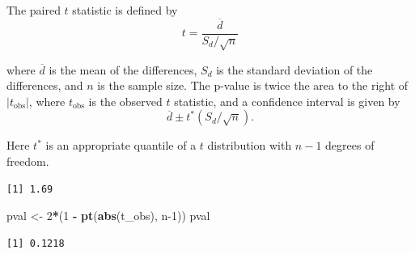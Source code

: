 \documentclass[
]{krantz}
\makeatletter
\newenvironment{Shaded}{\begin{snugshade}}{\end{snugshade}}
\newcommand{\DecValTok}[1]{\textcolor[rgb]{0.06,0.06,0.06}{#1}}
\newcommand{\KeywordTok}[1]{\textcolor[rgb]{0.27,0.27,0.27}{\textbf{#1}}}
\newcommand{\NormalTok}[1]{#1}
\newcommand{\OperatorTok}[1]{\textcolor[rgb]{0.43,0.43,0.43}{\textbf{#1}}}
\newcommand{\StringTok}[1]{\textcolor[rgb]{0.5,0.5,0.5}{#1}}
\newenvironment{kframe}{%
\medskip{}
\setlength{\fboxsep}{.8em}
 \def\at@end@of@kframe{}%
 \ifinner\ifhmode%
  \def\at@end@of@kframe{\end{minipage}}%
  \begin{minipage}{\columnwidth}%
 \fi\fi%
 \def\FrameCommand##1{\hskip\@totalleftmargin \hskip-\fboxsep
 \colorbox{shadecolor}{##1}\hskip-\fboxsep
     \hskip-\linewidth \hskip-\@totalleftmargin \hskip\columnwidth}%
 \MakeFramed {\advance\hsize-\width
   \@totalleftmargin\z@ \linewidth\hsize
   \@setminipage}}%
 {\par\unskip\endMakeFramed%
 \at@end@of@kframe}
\renewenvironment{Shaded}{\begin{kframe}}{\end{kframe}}
\makeatother
\begin{document}
The paired \(t\) statistic is defined by
\begin{equation}
t = \frac{\overline d}{S_d/\sqrt{n}}
\end{equation}

where \(\overline d\) is the mean of the differences, \(S_d\) is the standard deviation of the differences, and \(n\) is the sample size. The p-value is twice the area to the right of \(|t_{\text{obs}}|\), where \(t_{\text{obs}}\) is the observed \(t\) statistic, and a confidence interval is given by
\begin{equation}
\overline d \pm t^* (S_d/\sqrt{n}).
\end{equation}

Here \(t^*\) is an appropriate quantile of a \(t\) distribution with \(n-1\) degrees of freedom.

\begin{Shaded}
\end{Shaded}

\begin{verbatim}
[1] 1.69
\end{verbatim}

\begin{Shaded}
\begin{Highlighting}[]
\NormalTok{pval \textless{}{-}}\StringTok{ }\DecValTok{2}\OperatorTok{*}\NormalTok{(}\DecValTok{1} \OperatorTok{{-}}\StringTok{ }\KeywordTok{pt}\NormalTok{(}\KeywordTok{abs}\NormalTok{(t\_obs), n}\DecValTok{{-}1}\NormalTok{))}
\NormalTok{pval}
\end{Highlighting}
\end{Shaded}

\begin{verbatim}
[1] 0.1218
\end{verbatim}
\end{document}
